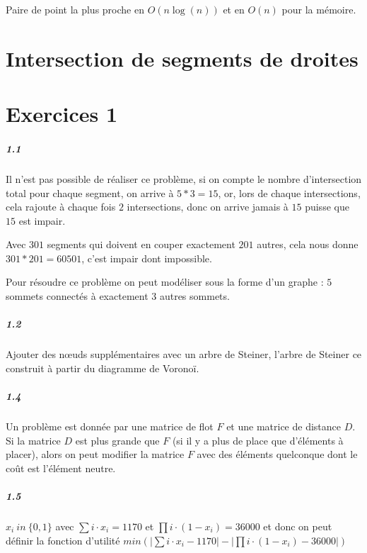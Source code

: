 \documentclass[11pt,a4paper]{report}
\begin{document}
Paire de point la plus proche en $O(n \log(n))$ et en $O(n)$ pour la mémoire.

\chapter{Intersection de segments de droites}

\chapter{Exercices 1}
\paragraph*{1.1} Il n'est pas possible de réaliser ce problème, si on compte le nombre d'intersection total pour chaque segment, on arrive à $5*3=15$, or, lors de chaque intersections, cela rajoute à chaque fois $2$ intersections, donc on arrive jamais à $15$ puisse que $15$ est impair.

Avec $301$ segments qui doivent en couper exactement $201$ autres, cela nous donne $301*201=60501$, c'est impair dont impossible.

Pour résoudre ce problème on peut modéliser sous la forme d'un graphe : $5$ sommets connectés à exactement $3$ autres sommets.

\paragraph*{1.2} Ajouter des nœuds supplémentaires avec un arbre de Steiner, l'arbre de Steiner ce construit à partir du diagramme de Voronoï.

\paragraph*{1.4} Un problème est donnée par une matrice de flot $F$ et une matrice de distance $D$. Si la matrice $D$ est plus grande que $F$ (si il y a plus de place que d'éléments à placer), alors on peut modifier la matrice $F$ avec des éléments quelconque dont le coût est l'élément neutre.

\paragraph*{1.5} $x_i\ in \ \{0,1\}$ avec $\sum i \cdot x_i = 1170$ et $\prod i \cdot (1-x_i) = 36000$ et donc on peut définir la fonction d'utilité $min(|\sum i \cdot x_i - 1170| - |\prod i \cdot (1-x_i) - 36000|)$
\end{document}
